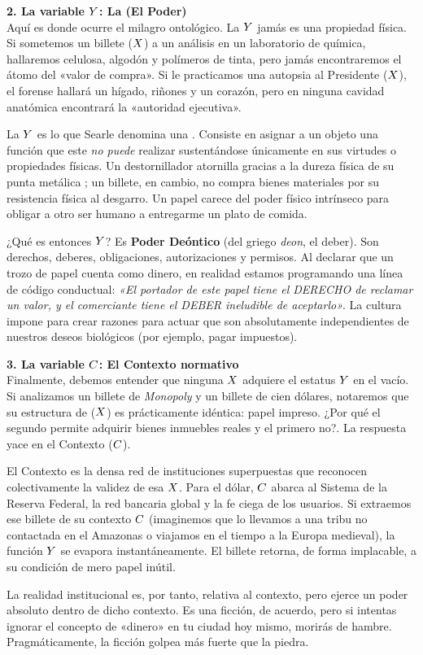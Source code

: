 \begin{argumento}
\textbf{2. La variable $Y$: La \FuncionEstatus{} (El Poder)}\\
Aquí es donde ocurre el milagro ontológico. La $Y$ jamás es una propiedad física. Si sometemos un billete ($X$) a un análisis en un laboratorio de química, hallaremos celulosa, algodón y polímeros de tinta, pero jamás encontraremos el átomo del «valor de compra». Si le practicamos una autopsia al Presidente ($X$), el forense hallará un hígado, riñones y un corazón, pero en ninguna cavidad anatómica encontrará la «autoridad ejecutiva». 

La $Y$ es lo que Searle denomina una \textbf{\FuncionEstatus}. Consiste en asignar a un objeto una función que este \textit{no puede} realizar sustentándose únicamente en sus virtudes o propiedades físicas. Un destornillador atornilla gracias a la dureza física de su punta metálica ; un billete, en cambio, no compra bienes materiales por su resistencia física al desgarro. Un papel carece del poder físico intrínseco para obligar a otro ser humano a entregarme un plato de comida. 

¿Qué es entonces $Y$? Es \textbf{Poder Deóntico} (del griego \textit{deon}, el deber). Son derechos, deberes, obligaciones, autorizaciones y permisos. Al declarar que un trozo de papel cuenta como dinero, en realidad estamos programando una línea de código conductual: \textit{«El portador de este papel tiene el DERECHO de reclamar un valor, y el comerciante tiene el DEBER ineludible de aceptarlo»}. La cultura impone \FuncionEstatus{} para crear razones para actuar que son absolutamente independientes de nuestros deseos biológicos (por ejemplo, pagar impuestos).
\end{argumento}

\begin{argumento}
\textbf{3. La variable $C$: El Contexto normativo}\\
Finalmente, debemos entender que ninguna $X$ adquiere el estatus $Y$ en el vacío. Si analizamos un billete de \textit{Monopoly} y un billete de cien dólares, notaremos que su estructura de \HechoBruto{} ($X$) es prácticamente idéntica: papel impreso. ¿Por qué el segundo permite adquirir bienes inmuebles reales y el primero no?. La respuesta yace en el Contexto ($C$). 

El Contexto es la densa red de instituciones superpuestas que reconocen colectivamente la validez de esa $X$. Para el dólar, $C$ abarca al Sistema de la Reserva Federal, la red bancaria global y la fe ciega de los usuarios. Si extraemos ese billete de su contexto $C$ (imaginemos que lo llevamos a una tribu no contactada en el Amazonas o viajamos en el tiempo a la Europa medieval), la función $Y$ se evapora instantáneamente. El billete retorna, de forma implacable, a su condición de mero papel inútil. 

La realidad institucional es, por tanto, relativa al contexto, pero ejerce un poder absoluto dentro de dicho contexto. Es una ficción, de acuerdo, pero si intentas ignorar el concepto de «dinero» en tu ciudad hoy mismo, morirás de hambre. Pragmáticamente, la ficción golpea más fuerte que la piedra.
\end{argumento}

